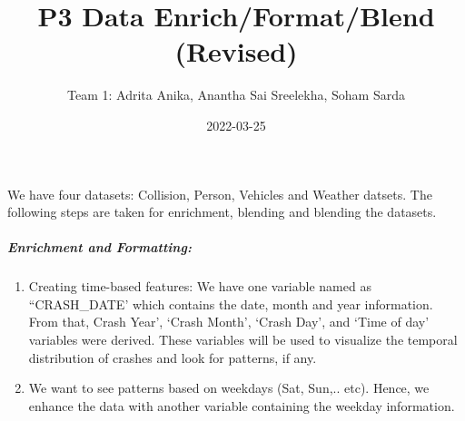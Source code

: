 \documentclass[
]{article}
\title{P3 Data Enrich/Format/Blend (Revised)}
\author{Team 1: Adrita Anika, Anantha Sai Sreelekha, Soham Sarda}
\date{2022-03-25}
\newenvironment{Shaded}{\begin{snugshade}}{\end{snugshade}}
\newcommand{\FunctionTok}[1]{\textcolor[rgb]{0.00,0.00,0.00}{#1}}
\newcommand{\NormalTok}[1]{#1}
\newcommand{\OtherTok}[1]{\textcolor[rgb]{0.56,0.35,0.01}{#1}}
\newcommand{\SpecialCharTok}[1]{\textcolor[rgb]{0.00,0.00,0.00}{#1}}
\newcommand{\StringTok}[1]{\textcolor[rgb]{0.31,0.60,0.02}{#1}}
\begin{document}
\maketitle

We have four datasets: Collision, Person, Vehicles and Weather datsets.
The following steps are taken for enrichment, blending and blending the
datasets.

\hypertarget{enrichment-and-formatting}{%
\subparagraph{Enrichment and
Formatting:}\label{enrichment-and-formatting}}

\begin{enumerate}
\def\labelenumi{\arabic{enumi}.}
\item
  Creating time-based features: We have one variable named as
  ``CRASH\_DATE' which contains the date, month and year information.
  From that, Crash Year', `Crash Month', `Crash Day', and `Time of day'
  variables were derived. These variables will be used to visualize the
  temporal distribution of crashes and look for patterns, if any.

\begin{Shaded}
\end{Shaded}
\item
  We want to see patterns based on weekdays (Sat, Sun,.. etc). Hence, we
  enhance the data with another variable containing the weekday
  information.


\end{enumerate}
\end{document}
